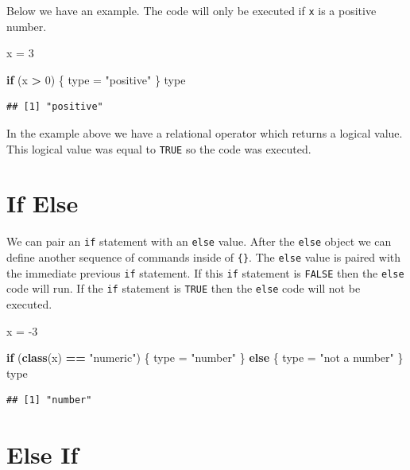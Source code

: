 \documentclass[
]{book}
\newenvironment{Shaded}{\begin{snugshade}}{\end{snugshade}}
\newcommand{\ControlFlowTok}[1]{\textcolor[rgb]{0.13,0.29,0.53}{\textbf{#1}}}
\newcommand{\DecValTok}[1]{\textcolor[rgb]{0.00,0.00,0.81}{#1}}
\newcommand{\KeywordTok}[1]{\textcolor[rgb]{0.13,0.29,0.53}{\textbf{#1}}}
\newcommand{\NormalTok}[1]{#1}
\newcommand{\OperatorTok}[1]{\textcolor[rgb]{0.81,0.36,0.00}{\textbf{#1}}}
\newcommand{\StringTok}[1]{\textcolor[rgb]{0.31,0.60,0.02}{#1}}
\begin{document}
Below we have an example. The code will only be executed if \texttt{x} is a positive number.

\begin{Shaded}
\begin{Highlighting}[]
\NormalTok{x =}\StringTok{ }\DecValTok{3}

\ControlFlowTok{if}\NormalTok{ (x }\OperatorTok{>}\StringTok{ }\DecValTok{0}\NormalTok{) \{}
\NormalTok{    type =}\StringTok{ "positive"}
\NormalTok{\}}
\NormalTok{type}
\end{Highlighting}
\end{Shaded}

\begin{verbatim}
## [1] "positive"
\end{verbatim}

In the example above we have a relational operator which returns a logical value. This logical value was equal to \texttt{TRUE} so the code was executed.

\hypertarget{if-else}{%
\section{If Else}\label{if-else}}

We can pair an \texttt{if} statement with an \texttt{else} value. After the \texttt{else} object we can define another sequence of commands inside of \texttt{\{\}}. The \texttt{else} value is paired with the immediate previous \texttt{if} statement. If this \texttt{if} statement is \texttt{FALSE} then the \texttt{else} code will run. If the \texttt{if} statement is \texttt{TRUE} then the \texttt{else} code will not be executed.

\begin{Shaded}
\begin{Highlighting}[]
\NormalTok{x =}\StringTok{ }\DecValTok{-3}

\ControlFlowTok{if}\NormalTok{ (}\KeywordTok{class}\NormalTok{(x) }\OperatorTok{==}\StringTok{ "numeric"}\NormalTok{) \{}
\NormalTok{    type =}\StringTok{ "number"}
\NormalTok{\} }\ControlFlowTok{else}\NormalTok{ \{}
\NormalTok{    type =}\StringTok{ "not a number"}
\NormalTok{\}}
\NormalTok{type}
\end{Highlighting}
\end{Shaded}

\begin{verbatim}
## [1] "number"
\end{verbatim}

\hypertarget{else-if}{%
\section{Else If}\label{else-if}}
\end{document}
